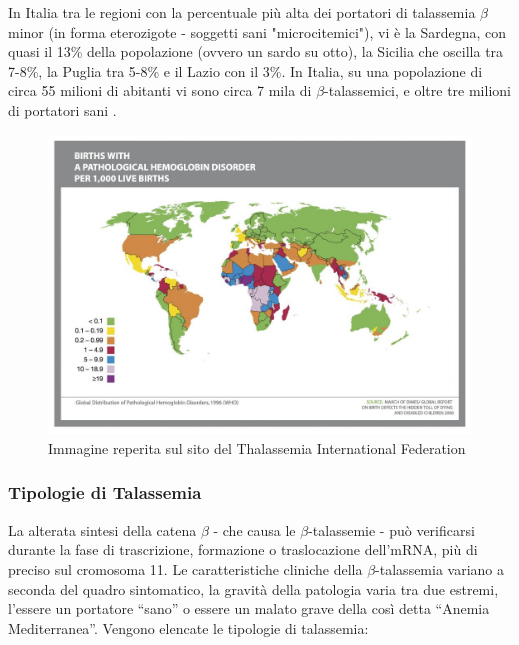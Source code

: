 \documentclass[12pt,a4paper,openright,twoside]{report}
\begin{document}
In Italia tra le regioni con la percentuale più alta dei portatori di talassemia $\beta$ minor (in forma eterozigote - soggetti sani "microcitemici"), vi è la Sardegna, con quasi il 13\% della popolazione (ovvero un sardo su otto), la Sicilia che oscilla tra 7-8\%, la Puglia tra 5-8\% e il Lazio con il 3\%. 
In Italia, su una popolazione di circa 55 milioni di abitanti vi sono circa 7 mila di $\beta$-talassemici, e oltre tre milioni di portatori sani \cite{atzeni2002beta}.

\begin{figure}[H]
\begin{center}
\includegraphics[width= 1\textwidth, height=1\textheight, keepaspectratio]{img/World-map-TIF-1024x724.jpg}
\caption{Immagine reperita sul sito del Thalassemia International Federation} \label{TIF}
\end{center}
\end{figure}

\subsubsection{Tipologie di Talassemia}
La alterata sintesi della catena $\beta$ - che causa le $\beta$-talassemie - può verificarsi durante la fase di trascrizione, formazione o traslocazione dell'mRNA, più di preciso sul cromosoma 11\cite{atzeni2002beta}. 
Le caratteristiche cliniche della $\beta$-talassemia variano a seconda del quadro sintomatico, la gravità della patologia varia tra due estremi,  l'essere un portatore ``sano'' o essere un malato grave della così detta ``Anemia Mediterranea''. Vengono elencate le tipologie di talassemia:
\end{document}
